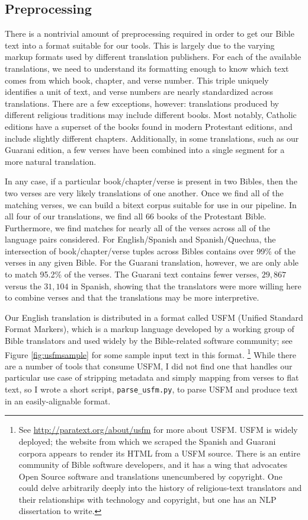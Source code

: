 \subsection{Preprocessing}
There is a nontrivial amount of preprocessing required in order to get our
Bible text into a format suitable for our tools.  This is largely due to the
varying markup formats used by different translation publishers.
For each of the available translations, we need to understand its formatting
enough to know which text comes from which book, chapter, and verse number.
This triple uniquely identifies a unit of text, and verse numbers are nearly
standardized across translations.  There are a few exceptions, however:
translations produced by different religious traditions may include different
books. Most notably, Catholic editions have a superset of the books found in
modern Protestant editions, and include slightly different chapters.
Additionally, in some translations, such as our Guarani edition, a few verses
have been combined into a single segment for a more natural translation.

In any case, if a particular book/chapter/verse is present in two Bibles, then
the two verses are very likely translations of one another. Once we find all of
the matching verses, we can build a bitext corpus suitable for use in our
pipeline.  In all four of our translations, we find all 66 books of the
Protestant Bible. Furthermore, we find matches for nearly all of the verses
across all of the language pairs considered. For English/Spanish and
Spanish/Quechua, the intersection of book/chapter/verse tuples across Bibles
contains over 99\% of the verses in any given Bible. For the Guarani
translation, however, we are only able to match 95.2\% of the verses. The
Guarani text contains fewer verses, $29,867$ versus the $31,104$ in Spanish,
showing that the translators were more willing here to combine verses and that
the translations may be more interpretive.

Our English translation is distributed in a format called USFM (Unified
Standard Format Markers), which is a markup language developed by a working
group of Bible translators and used widely by the Bible-related software
community; see Figure \ref{fig:usfmsample} for some sample input text in this
format.
\footnote{See \url{http://paratext.org/about/usfm} for more about USFM. USFM is
widely deployed; the website from which we scraped the Spanish and Guarani
corpora appears to render its HTML from a USFM source.  There is an entire
community of Bible software developers, and it has a wing that advocates Open
Source software and translations unencumbered by copyright.  One could delve
arbitrarily deeply into the history of religious-text translators and their
relationships with technology and copyright, but one has an NLP dissertation to
write.}
While there are a number of tools that consume USFM, I did not find one that
handles our particular use case of stripping metadata and simply mapping from
verses to flat text, so I wrote a short script, \texttt{parse\_usfm.py}, to
parse USFM and produce text in an easily-alignable format.


